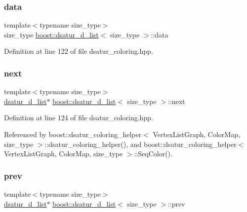 \subsubsection{\texorpdfstring{data}{data}}
{\footnotesize\ttfamily template$<$typename size\+\_\+type$>$ \\
size\+\_\+type \hyperlink{structboost_1_1dsatur__d__list}{boost\+::dsatur\+\_\+d\+\_\+list}$<$ size\+\_\+type $>$\+::data}



Definition at line 122 of file dsatur\+\_\+coloring.\+hpp.

\mbox{\label{structboost_1_1dsatur__d__list_a2c754a7fd844b9b893ecf34ef428f5ac}} 
\subsubsection{\texorpdfstring{next}{next}}
{\footnotesize\ttfamily template$<$typename size\+\_\+type$>$ \\
\hyperlink{structboost_1_1dsatur__d__list}{dsatur\+\_\+d\+\_\+list}$\ast$ \hyperlink{structboost_1_1dsatur__d__list}{boost\+::dsatur\+\_\+d\+\_\+list}$<$ size\+\_\+type $>$\+::next}



Definition at line 124 of file dsatur\+\_\+coloring.\+hpp.



Referenced by boost\+::dsatur\+\_\+coloring\+\_\+helper$<$ Vertex\+List\+Graph, Color\+Map, size\+\_\+type $>$\+::dsatur\+\_\+coloring\+\_\+helper(), and boost\+::dsatur\+\_\+coloring\+\_\+helper$<$ Vertex\+List\+Graph, Color\+Map, size\+\_\+type $>$\+::\+Seq\+Color().

\mbox{\label{structboost_1_1dsatur__d__list_a809fd0812c52eb6861250b6f7e4d2f92}} 
\subsubsection{\texorpdfstring{prev}{prev}}
{\footnotesize\ttfamily template$<$typename size\+\_\+type$>$ \\
\hyperlink{structboost_1_1dsatur__d__list}{dsatur\+\_\+d\+\_\+list}$\ast$ \hyperlink{structboost_1_1dsatur__d__list}{boost\+::dsatur\+\_\+d\+\_\+list}$<$ size\+\_\+type $>$\+::prev}



